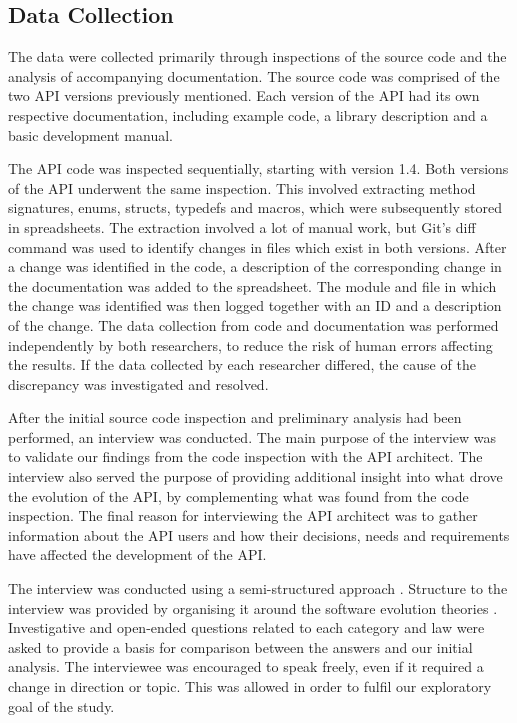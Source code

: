 \documentclass{sig-alternate}
\begin{document}
\subsection{Data Collection} \label{data_collection}  %
The data were collected primarily through inspections of the source code and the analysis of accompanying documentation. The source code was comprised of the two API versions previously mentioned. Each version of the API had its own respective documentation, including example code, a library description and a basic development manual. 

The API code was inspected sequentially, starting with version 1.4. Both versions of the API underwent the same inspection. This involved extracting method signatures, enums, structs, typedefs and macros, which were subsequently stored in spreadsheets. The extraction involved a lot of manual work, but Git's \cite{git} diff command was used to identify changes in files which exist in both versions. After a change was identified in the code, a description of the corresponding change in the documentation was added to the spreadsheet. The module and file in which the change was identified was then logged together with an ID and a description of the change. The data collection from code and documentation was performed independently by both researchers, to reduce the risk of human errors affecting the results. If the data collected by each researcher differed, the cause of the discrepancy was investigated and resolved. 

After the initial source code inspection and preliminary analysis had been performed, an interview was conducted. The main purpose of the interview was to validate our findings from the code inspection with the API architect. The interview also served the purpose of providing additional insight into what drove the evolution of the API, by complementing what was found from the code inspection. The final reason for interviewing the API architect was to gather information about the API users and how their decisions, needs and requirements have affected the development of the API. 

The interview was conducted using a semi-structured approach \cite{robson2002real}. Structure to the interview was provided by organising it around the software evolution theories \cite{chapin2001types} \cite{lehman1980programs}. Investigative and open-ended questions related to each category and law were asked to provide a basis for comparison between the answers and our initial analysis. The interviewee was encouraged to speak freely, even if it required a change in direction or topic. This was allowed in order to fulfil our exploratory goal of the study. 
\end{document}
